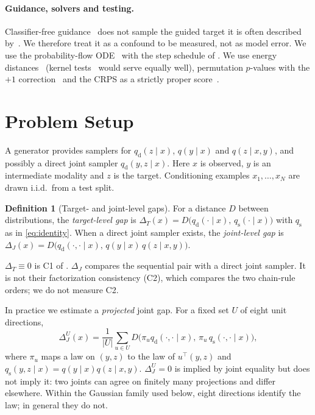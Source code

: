 \documentclass{article}
\theoremstyle{plain}
\theoremstyle{definition}
\newtheorem{definition}[theorem]{Definition}
\theoremstyle{remark}
\newcommand{\qd}{q_{\mathrm{d}}}
\newcommand{\qs}{q_{\mathrm{s}}}
\begin{document}
\paragraph{Guidance, solvers and testing.}
Classifier-free guidance~\citep{ho2022cfg} does not sample the guided target it is often described by~\citep{chidambaram2024guidance,bradley2024cfg}. We therefore treat it as a confound to be measured, not as model error.
We use the probability-flow ODE~\citep{song2021sde} with the step schedule of \citet{karras2022edm}.
We use energy distances~\citep{szekely2013energy,baringhaus2004twosample} (kernel tests~\citep{gretton2012kernel} would serve equally well), permutation $p$-values with the $+1$ correction~\citep{phipson2010permutation,ernst2004permutation} and the CRPS as a strictly proper score~\citep{gneiting2007proper}.

\section{Problem Setup}
\label{sec:setup}

A generator provides samplers for $\qd(z\mid x)$, $q(y\mid x)$ and $q(z\mid x,y)$, and possibly a direct joint sampler $\qd(y,z\mid x)$.
Here $x$ is observed, $y$ is an intermediate modality and $z$ is the target. Conditioning examples $x_1,\dots,x_N$ are drawn i.i.d.\ from a test split.

\begin{definition}[Target- and joint-level gaps]
For a distance $D$ between distributions, the \emph{target-level gap} is $\Delta_T(x) = D\big(\qd(\cdot\mid x),\,\qs(\cdot\mid x)\big)$ with $\qs$ as in \eqref{eq:identity}.
When a direct joint sampler exists, the \emph{joint-level gap} is $\Delta_J(x) = D\big(\qd(\cdot,\cdot\mid x),\,q(y\mid x)\,q(z\mid x,y)\big)$.
\end{definition}

$\Delta_T\equiv 0$ is C1 of \citet{klotergens2026tabular}.
$\Delta_J$ compares the sequential pair with a direct joint sampler. It is not their factorization consistency (C2), which compares the two chain-rule orders; we do not measure C2.

In practice we estimate a \emph{projected} joint gap. For a fixed set $U$ of eight unit directions,
\begin{equation}
  \Delta_J^{U}(x)=\frac{1}{|U|}\sum_{u\in U}D\big(\pi_u\qd(\cdot,\cdot\mid x),\,\pi_u\,q_{\mathrm{s}}(\cdot,\cdot\mid x)\big),
  \label{eq:projected}
\end{equation}
where $\pi_u$ maps a law on $(y,z)$ to the law of $u^\top(y,z)$ and $q_{\mathrm{s}}(y,z\mid x)=q(y\mid x)q(z\mid x,y)$.
$\Delta_J^U=0$ is implied by joint equality but does not imply it: two joints can agree on finitely many projections and differ elsewhere.
Within the Gaussian family used below, eight directions identify the law; in general they do not.
\end{document}
